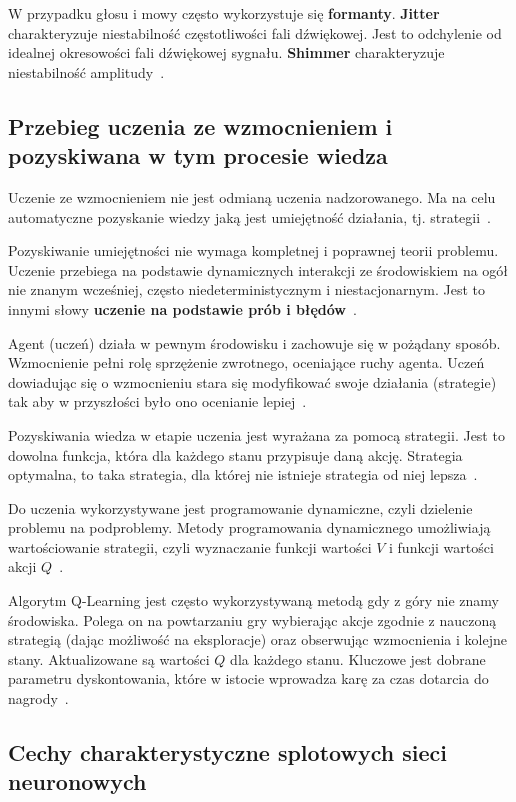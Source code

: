 \documentclass[wi]{zut}
\begin{document}
W przypadku głosu i mowy często wykorzystuje się \textbf{formanty}. \textbf{Jitter} charakteryzuje niestabilność częstotliwości fali dźwiękowej. Jest to odchylenie od idealnej okresowości fali dźwiękowej sygnału. \textbf{Shimmer} charakteryzuje niestabilność amplitudy~\cite{Polrolniczak}.

\subsection{Przebieg uczenia ze wzmocnieniem i pozyskiwana w tym procesie wiedza}

Uczenie ze wzmocnieniem nie jest odmianą uczenia nadzorowanego. Ma na celu automatyczne pozyskanie wiedzy jaką jest umiejętność działania, tj. strategii~\cite{Pluto}.

Pozyskiwanie umiejętności nie wymaga kompletnej i poprawnej teorii problemu. Uczenie przebiega na podstawie dynamicznych interakcji ze środowiskiem na ogół nie znanym wcześniej, często niedeterministycznym i niestacjonarnym. Jest to innymi słowy \textbf{uczenie na podstawie prób i błędów}~\cite{Pluto}.

Agent (uczeń) działa w pewnym środowisku i zachowuje się w pożądany sposób. Wzmocnienie pełni rolę sprzężenie zwrotnego, oceniające ruchy agenta. Uczeń dowiadując się o wzmocnieniu stara się modyfikować swoje działania (strategie) tak aby w przyszłości było ono ocenianie lepiej~\cite{Pluto}.

Pozyskiwania wiedza w etapie uczenia jest wyrażana za pomocą strategii. Jest to dowolna funkcja, która dla każdego stanu przypisuje daną akcję. Strategia optymalna, to taka strategia, dla której nie istnieje strategia od niej lepsza~\cite{Pluto}.

Do uczenia wykorzystywane jest programowanie dynamiczne, czyli dzielenie problemu na podproblemy. Metody programowania dynamicznego umożliwiają wartościowanie strategii, czyli wyznaczanie funkcji wartości $V$ i funkcji wartości akcji $Q$~\cite{Pluto}.

Algorytm Q-Learning jest często wykorzystywaną metodą gdy z góry nie znamy środowiska. Polega on na powtarzaniu gry wybierając akcje zgodnie z nauczoną strategią (dając możliwość na eksploracje) oraz obserwując wzmocnienia i kolejne stany. Aktualizowane są wartości $Q$ dla każdego stanu. Kluczowe jest dobrane parametru dyskontowania, które w istocie wprowadza karę za czas dotarcia do nagrody~\cite{Pluto}.

\subsection{Cechy charakterystyczne splotowych sieci neuronowych}
\end{document}
